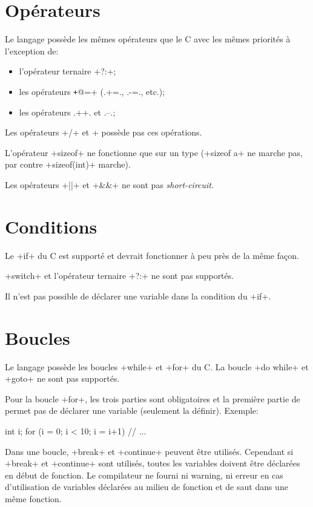 \documentclass{article}
\begin{document}
  \section{Opérateurs}
    Le langage possède les mêmes opérateurs que le C avec les mêmes priorités à
    l'exception de:
    \begin{itemize}
      \item l'opérateur ternaire \imoc+?:+;
      \item les opérateurs \texttt+@=+ (\imoc.+=., \imoc.-=., etc.);
      \item les opérateurs \imoc.++. et \imoc.--.;
    \end{itemize}

    Les opérateurs \imoc+/+ et \imoc+%
    possède pas ces opérations.

    L'opérateur \imoc+sizeof+ ne fonctionne que sur un type (\imoc+sizeof a+ ne
    marche pas, par contre \imoc+sizeof(int)+ marche).

    Les opérateurs \imoc+||+ et \imoc+&&+ ne sont pas \emph{short-circuit}.

  \section{Conditions}
    Le \imoc+if+ du C est supporté et devrait fonctionner à peu près de la même
    façon.

    \imoc+switch+ et l'opérateur ternaire \imoc+?:+ ne sont pas supportés.

    Il n'est pas possible de déclarer une variable dans la condition du
    \imoc+if+.

  \section{Boucles}
    Le langage possède les boucles \imoc+while+ et \imoc+for+ du C. La boucle
    \imoc+do {} while+ et \imoc+goto+ ne sont pas supportés.

    Pour la boucle \imoc+for+, les trois parties sont obligatoires et la
    première partie de permet pas de déclarer une variable (seulement la
    définir). Exemple:

    \begin{moc}
int i;
for (i = 0; i < 10; i = i+1) {
    // ...
}
    \end{moc}

    Dans une boucle, \imoc+break+ et \imoc+continue+ peuvent être utilisés.
    Cependant si \imoc+break+ et \imoc+continue+ sont utilisés, toutes les
    variables doivent être déclarées en début de fonction. Le compilateur ne
    fourni ni warning, ni erreur en cas d'utilisation de variables déclarées au
    milieu de fonction et de saut dans une même fonction.
\end{document}
